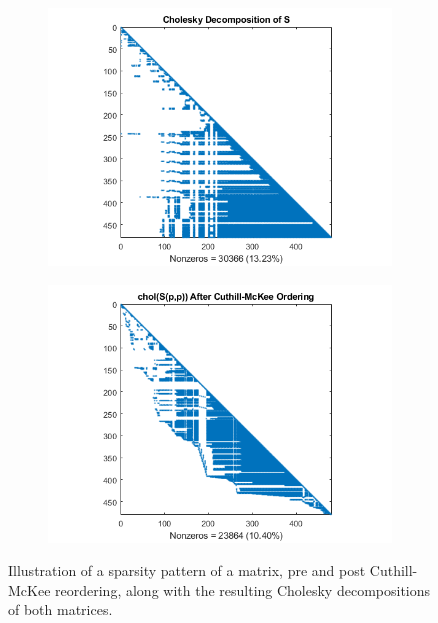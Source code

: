 \begin{figure}
\begin{subfigure}{0.49\textwidth}
        \includegraphics[width=\textwidth]{Figures/chol_unordered}
    \end{subfigure}\hfill
     \begin{subfigure}{0.49\textwidth}
        \includegraphics[width=\textwidth]{Figures/chol_cmckee}
    \end{subfigure}
    \caption{Illustration of a sparsity pattern of a matrix, pre and post Cuthill-McKee reordering, along with the resulting Cholesky decompositions of both matrices.}
    \label{fig:ordering}
\end{figure}